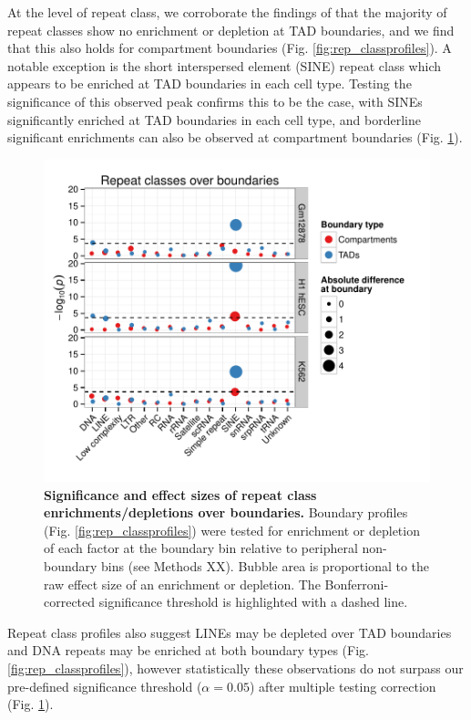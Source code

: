 \documentclass[a4paper,10pt,oneside]{book}
\begin{document}
At the level of repeat class, we corroborate the findings of \citet{Dixon2012} that the majority of repeat classes show no enrichment or depletion at TAD boundaries, and we find that this also holds for compartment boundaries (Fig. \ref{fig:rep_classprofiles}). A notable exception is the short interspersed element (SINE) repeat class which appears to be enriched at TAD boundaries in each cell type. Testing the significance of this observed peak confirms this to be the case, with SINEs significantly enriched at TAD boundaries in each cell type, and borderline significant enrichments can also be observed at compartment boundaries (Fig. \ref{fig:rep_classbubble}).

\begin{figure}
\begin{center} 
\includegraphics[width=.9\textwidth]{figs/rep_classbubble.pdf}
\captionsetup{width=\textwidth}
\caption{ {\bf Significance and effect sizes of repeat class enrichments/depletions over boundaries.}
Boundary profiles (Fig. \ref{fig:rep_classprofiles}) were tested for enrichment or depletion of each factor at the boundary bin relative to peripheral non-boundary bins (see Methods XX). Bubble area is proportional to the raw effect size of an enrichment or depletion. The Bonferroni-corrected significance threshold is highlighted with a dashed line.
}\label{fig:rep_classbubble}
\end{center}
\end{figure} 

Repeat class profiles also suggest LINEs may be depleted over TAD boundaries and DNA repeats may be enriched at both boundary types (Fig. \ref{fig:rep_classprofiles}), however statistically these observations do not surpass our pre-defined significance threshold ($\alpha = 0.05$) after multiple testing correction (Fig. \ref{fig:rep_classbubble}).
\end{document}
